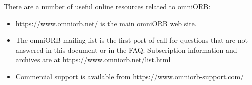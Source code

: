 \documentclass[11pt,oneside,a4paper]{book}
\begin{document}
There are a number of useful online resources related to omniORB:

\begin{itemize}

\item \url{https://www.omniorb.net/} is the main omniORB web
  site.

\item The omniORB mailing list is the first port of call for questions
  that are not answered in this document or in the FAQ. Subscription
  information and archives are at
  \url{https://www.omniorb.net/list.html}

\item Commercial support is available from
  \url{https://www.omniorb-support.com/}

\end{itemize}



\backmatter


\end{document}
